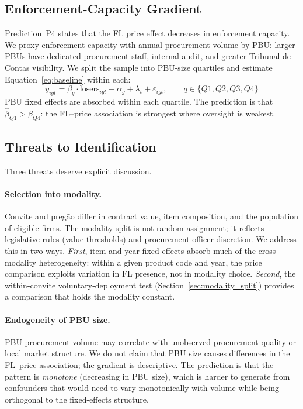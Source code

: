 \subsection{Enforcement-Capacity Gradient}
\label{sec:oversight}

Prediction~P4 states that the FL price effect decreases in
enforcement capacity. We proxy enforcement capacity with annual
procurement volume by PBU: larger PBUs have dedicated procurement
staff, internal audit, and greater Tribunal de Contas visibility.
We split the sample into PBU-size quartiles and estimate
Equation~\eqref{eq:baseline} within each:
\begin{equation}
  y_{igt} = \beta_q \cdot \text{losers}_{igt}
  + \alpha_g + \lambda_t + \varepsilon_{igt},
  \qquad q \in \{Q1, Q2, Q3, Q4\}
  \label{eq:pbu_split}
\end{equation}
PBU fixed effects are absorbed within each quartile. The prediction
is that $\hat{\beta}_{Q1} > \hat{\beta}_{Q4}$: the FL--price
association is strongest where oversight is weakest.

\subsection{Threats to Identification}
\label{sec:threats}

Three threats deserve explicit discussion.

\paragraph{Selection into modality.}
Convite and preg\~ao differ in contract value, item composition,
and the population of eligible firms. The modality split is not
random assignment; it reflects legislative rules (value thresholds)
and procurement-officer discretion. We address this in two ways.
\emph{First}, item and year fixed effects absorb much of the
cross-modality heterogeneity: within a given product code and year,
the price comparison exploits variation in FL presence, not in
modality choice. \emph{Second}, the within-convite
voluntary-deployment test (Section~\ref{sec:modality_split})
provides a comparison that holds the modality constant.

\paragraph{Endogeneity of PBU size.}
PBU procurement volume may correlate with unobserved procurement
quality or local market structure. We do not claim that PBU size
causes differences in the FL--price association; the gradient is
descriptive. The prediction is that the pattern is \emph{monotone}
(decreasing in PBU size), which is harder to generate from
confounders that would need to vary monotonically with volume
while being orthogonal to the fixed-effects structure.

